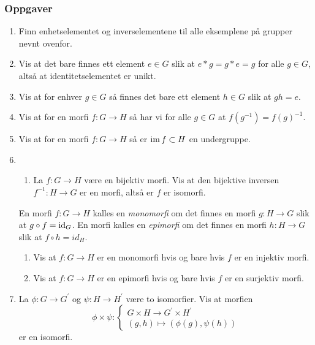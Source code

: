 \subsubsection*{Oppgaver}
\begin{enumerate}
    \item Finn enhetselementet og inverselementene til alle eksemplene på
        grupper nevnt ovenfor.
    \item Vis at det bare finnes ett element $e\in G$ slik
        at $e \ast g = g\ast e = g$ for alle $g\in G$,
        altså at identitetselementet er unikt.
    \item Vis at for enhver $g\in G$ så finnes det bare ett element
        $h\in G$ slik at $gh = e$.
    \item Vis at for en morfi $f\colon G\to H$
        så har vi for alle $g\in G$ at $f(g^{-1}) = {f(g)}^{-1}$.
    \item Vis at for en morfi $f\colon G\to H$ så er $\operatorname{im} f\subset H$ en undergruppe.
    \item
        \begin{enumerate}
            \item La $f\colon G\to H$ være en bijektiv morfi.
                Vis at den bijektive inversen $f^{-1}\colon H\to G$
                er en morfi, altså er $f$ er isomorfi.
        \end{enumerate}
        En morfi $f\colon G\to H$ kalles en \textit{monomorfi}
        om det finnes en morfi $g\colon H\to G$ slik at $g\circ f=\operatorname{id}_G$.
        En morfi kalles en \textit{epimorfi} om det finnes en morfi
        $h\colon H\to G$ slik at $f\circ h = id_H$.
        \begin{enumerate}[resume]
            \item Vis at $f\colon G\to H$ er en monomorfi hvis og bare hvis $f$
                er en injektiv morfi.
            \item Vis at $f\colon G\to H$ er en epimorfi hvis og bare hvis $f$
                er en surjektiv morfi.
        \end{enumerate}
    \item La $\phi\colon G\to G^\prime$ og $\psi\colon H\to H^\prime$
        være to isomorfier.
        Vis at morfien
        \[
            \phi\times\psi\colon\begin{cases}
                G\times H\to G^\prime\times H^\prime
                \\
                (g,h)\mapsto(\phi(g),\psi(h))
            \end{cases}
        \]
        er en isomorfi.
\end{enumerate}

